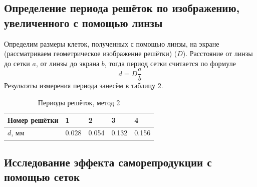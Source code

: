 \documentclass[a4paper]{article}
\begin{document}
\subsection{Определение периода решёток по изображению, увеличенного с помощью линзы}


Определим размеры клеток, полученных с помощью линзы, на экране (рассматриваем геометрическое изображение решётки) ($D$). Расстояние от линзы до сетки $a$, от линзы до экрана $b$, тогда период сетки считается по формуле 
    \begin{equation}
        d = D\frac{a}{b}
    \end{equation}
    Результаты измерения периода занесём в таблицу 2.


    \begin{table}[h]
    \centering
    \begin{center}
    \caption{Периоды решёток, метод 2}
    \end{center}
    \vspace{0.1cm}
    \label{tab:my_label}
    \begin{tabular}{ |p{2.5cm}||p{0.7cm}|p{0.7cm}|p{0.7cm}|p{0.7cm}|}
 \hline
Номер решётки & 1 & 2 & 3 & 4\\
 \hline
 $d$, мм & 0.028 & 0.054 & 0.132 & 0.156\\

 \hline
 
\end{tabular}
\end{table}

\subsection{Исследование эффекта саморепродукции с помощью сеток}
\end{document}
